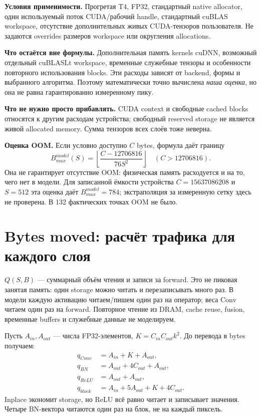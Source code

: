 \documentclass[11pt,a4paper]{article}
\newcommand{\page}[1]{\clearpage\section{#1}}
\begin{document}
\textbf{Условия применимости.} Прогретая T4, FP32, стандартный native
allocator, один используемый поток CUDA/рабочий handle, стандартный cuBLAS
workspace, отсутствие дополнительных живых CUDA-тензоров пользователя.
Не задаются overrides размеров workspace или округления allocations.

\textbf{Что остаётся вне формулы.} Дополнительная память kernels cuDNN,
возможный отдельный cuBLASLt workspace, временные служебные тензоры и
особенности повторного использования blocks. Эти расходы зависят от
backend, формы и выбранного алгоритма. Поэтому математически точно
вычислена \emph{наша оценка}, но она не равна гарантированно измеренному пику.

\textbf{Что не нужно просто прибавлять.} CUDA context и свободные cached
blocks относятся к другим расходам устройства; свободный reserved storage
не является живой allocated memory. Сумма тензоров всех слоёв тоже неверна.

\textbf{Оценка OOM.} Если условно доступно $C$ bytes, формула даёт границу
\[
 B_{max}^{model}(S)=\left\lfloor\frac{C-12706816}{76S^2}\right\rfloor
 \quad(C>12706816).
\]
Она не гарантирует отсутствие OOM: физическая память расходуется и на то,
чего нет в модели. Для записанной ёмкости устройства $C=15637086208$ и
$S=512$ эта оценка даёт $B_{max}^{model}=784$; экстраполяция за измеренную
сетку здесь не проверена. В 132 фактических точках OOM не было.

\page{Bytes moved: расчёт трафика для каждого слоя}
$Q(S,B)$ --- суммарный объём чтения и записи за forward. Это не пиковая
занятая память: один storage можно читать и перезаписывать много раз.
В модели каждую активацию читаем/пишем один раз на оператор; веса Conv
читаем один раз на forward. Повторное чтение из DRAM, cache reuse,
fusion, временные buffers и служебные данные не моделируем.

Пусть $A_{in},A_{out}$ --- числа FP32-элементов, $K=C_{in}C_{out}k^2$.
До перевода в bytes получаем:
\begin{align*}
 q_{Conv}&=A_{in}+K+A_{out},\\
 q_{BN}&=A_{out}+4C_{out}+A_{out},\\
 q_{ReLU}&=A_{out}+A_{out},\\
 \boxed{q_{block}}&\boxed{=A_{in}+5A_{out}+K+4C_{out}.}
\end{align*}
Inplace экономит storage, но ReLU всё равно читает и записывает значения.
Четыре BN-вектора читаются один раз на блок, не на каждый пиксель.
\end{document}
